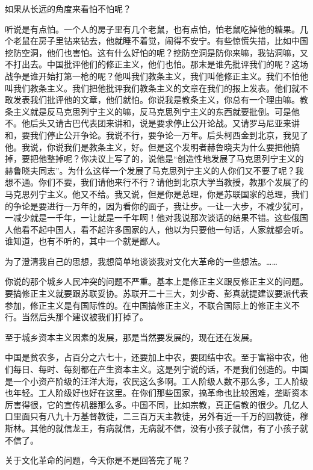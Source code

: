 如果从长远的角度来看怕不怕呢？

听说是有点怕。一个人的房子里有几个老鼠，也有点怕，怕老鼠吃掉他的糖果。几个老鼠在房子里钻来钻去，他就睡不着觉，闹得不安宁。有些惊慌失措，比如中国挖防空洞，他们也害怕。这有什么好怕的呢？挖防空洞是防你来嘛，我钻洞嘛，又不打出去。中国批评他们的修正主义，他们也怕。那末是谁先批评我们的呢？这场战争是谁开始打第一枪的呢？他叫我们教条主义，我们叫他修正主义。我们不怕他叫我们教条主义。我们把他批评我们教条主义的文章在我们的报上发表。他们就不敢发表我们批评他的文章，他们就怕。你说我是教条主义，你总有一个理由嘛。教条主义就是反马克思列宁主义的嘛，反马克思列宁主义的东西就要批倒。可是他不。他后头又请古巴代表团来讲和，说是要求停止公开论战。又请罗马尼亚来讲和，要我们停止公开争论。我说不行，要争论一万年。后头柯西金到北京，我见了他。我说，你说我们是教条主义，好。但是这个发明者赫鲁晓夫为什么要把他搞掉，要把他整掉呢？你决议上写了的，说他是“创造性地发展了马克思列宁主义的赫鲁晓夫同志”。为什么这样一个发展了马克思列宁主义的人你们又不要了呢？我想不通。你们不要，我们请他来行不行？请他到北京大学当教授，教那个发展了的马克思列宁主义。他又不给。我又说，但是你是总理，你是苏联国家的总理，我们的争论是要进行一万年的，因为看你的面子，我让步。一让一大步，不减少犹可，一减少就是一千年，一让就是一千年啊！他对我说那次谈话的结果不错。这些俄国人他看不起中国人，看不起许多国家的人，他以为只要他一句话，人家就都会听。谁知道，也有不听的，其中一个就是鄙人。

为了澄清我自己的思想，我想简单地谈谈我对文化大革命的一些想法。……

你说的那个城乡人民冲突的问题不严重。基本上是修正主义跟反修正主义的问题。要搞修正主义就要跟苏联妥协。苏联开二十三大，刘少奇、彭真就提建议要派代表参加，修正主义是有国际性的。在中国搞修正主义，不联合国际上的修正主义不行。当然后头那个建议被我们打掉了。

至于城乡资本主义因素的发展，那是当然要发展的，现在还在发展。

中国是贫农多，占百分之六七十，还要加上中农，要团结中农。至于富裕中农，他们每日、每时、每刻都在产生资本主义。这是列宁说的话，不是我们创造的。中国是一个小资产阶级的汪洋大海，农民这么多啊。工人阶级人数不那么多，工人阶级也年轻。工人阶级好也好在这里。在你们那些国家，搞革命也比较困难，垄断资本厉害得很，它的宣传机器那么多。中国不同，比如宗教，真正信教的很少。几亿人口里面只有八九十万基督教徒，二三百万天主教徒，另外有近一千万的回教徒，穆斯林。其他的就信龙王，有病就信，无病就不信，没有小孩子就信，有了小孩子就不信了。

关于文化革命的问题，今天你是不是回答完了呢？

